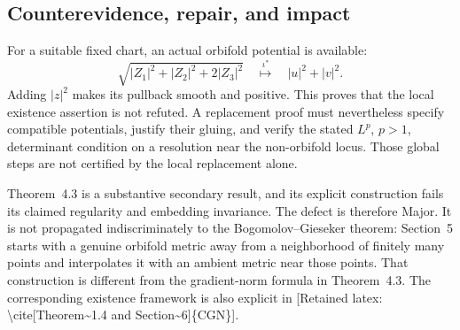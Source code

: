 \documentclass[10pt]{article}
\begin{document}
\subsection*{Counterevidence, repair, and impact}
For a suitable fixed chart, an actual orbifold potential is available: \[\sqrt{|Z_1|^2+|Z_2|^2+2|Z_3|^2}
 \quad\stackrel{\iota^*}{\longmapsto}\quad |u|^2+|v|^2.\] Adding \(|z|^2\) makes its pullback smooth and positive. This proves that the local existence assertion is not refuted. A replacement proof must nevertheless specify compatible potentials, justify their gluing, and verify the stated \(L^p\), \(p>1\), determinant condition on a resolution near the non-orbifold locus. Those global steps are not certified by the local replacement alone.\par
Theorem 4.3 is a substantive secondary result, and its explicit construction fails its claimed regularity and embedding invariance. The defect is therefore Major. It is not propagated indiscriminately to the Bogomolov–Gieseker theorem: Section 5 starts with a genuine orbifold metric away from a neighborhood of finitely many points and interpolates it with an ambient metric near those points. That construction is different from the gradient-norm formula in Theorem 4.3. The corresponding existence framework is also explicit in [Retained latex: \textbackslash{}cite[Theorem\textasciitilde{}1.4 and Section\textasciitilde{}6]\{CGN\}].\par
\end{document}
